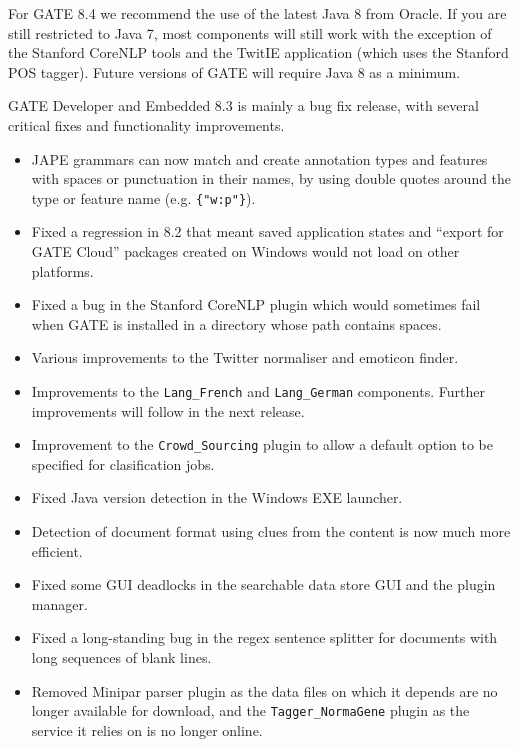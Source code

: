 
For GATE 8.4 we recommend the use of the latest Java 8 from Oracle.  If you are
still restricted to Java 7, most components will still work with the exception
of the Stanford CoreNLP tools and the TwitIE application (which uses the
Stanford POS tagger).  Future versions of GATE will require Java 8 as a
minimum.


GATE Developer and Embedded 8.3 is mainly a bug fix release, with several
critical fixes and functionality improvements.

\begin{itemize}
\item JAPE grammars can now match and create annotation types and features
  with spaces or punctuation in their names, by using double quotes around
  the type or feature name (e.g. \verb!{"w:p"}!).
\item Fixed a regression in 8.2 that meant saved application states and
  ``export for GATE Cloud'' packages created on Windows would not load on other
  platforms.
\item Fixed a bug in the Stanford CoreNLP plugin which would sometimes fail
  when GATE is installed in a directory whose path contains spaces.
\item Various improvements to the Twitter normaliser and emoticon finder.
\item Improvements to the \verb!Lang_French! and \verb!Lang_German! components.
  Further improvements will follow in the next release.
\item Improvement to the \verb!Crowd_Sourcing! plugin to allow a default
  option to be specified for clasification jobs.
\item Fixed Java version detection in the Windows EXE launcher.
\item Detection of document format using clues from the content is now much
  more efficient.
\item Fixed some GUI deadlocks in the searchable data store GUI and the plugin
  manager.
\item Fixed a long-standing bug in the regex sentence splitter for documents
  with long sequences of blank lines.
\item Removed Minipar parser plugin as the data files on which it depends are
  no longer available for download, and the \verb!Tagger_NormaGene! plugin as
  the service it relies on is no longer online.
\end{itemize}

